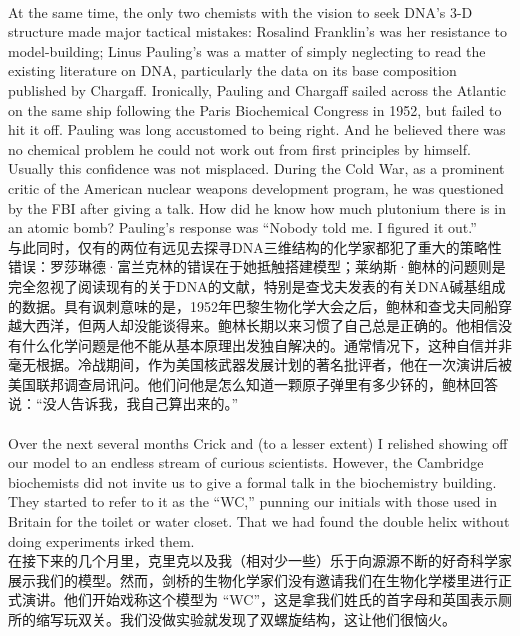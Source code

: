 \documentclass{article}
\begin{document}
\\
At the same time, the only two chemists with the vision to seek DNA’s 3-D structure made major tactical mistakes: Rosalind Franklin’s was her resistance to model-building; Linus Pauling’s was a matter of simply neglecting to read the existing literature on DNA, particularly the data on its base composition published by Chargaff. Ironically, Pauling and Chargaff sailed across the Atlantic on the same ship following the Paris Biochemical Congress in 1952, but failed to hit it off. Pauling was long accustomed to being right. And he believed there was no chemical problem he could not work out from first principles by himself. Usually this confidence was not misplaced. During the Cold War, as a prominent critic of the American nuclear weapons development program, he was questioned by the FBI after giving a talk. How did he know how much plutonium there is in an atomic bomb? Pauling’s response was “Nobody told me. I figured it out.”\\
与此同时，仅有的两位有远见去探寻DNA三维结构的化学家都犯了重大的策略性错误：罗莎琳德·富兰克林的错误在于她抵触搭建模型；莱纳斯·鲍林的问题则是完全忽视了阅读现有的关于DNA的文献，特别是查戈夫发表的有关DNA碱基组成的数据。具有讽刺意味的是，1952年巴黎生物化学大会之后，鲍林和查戈夫同船穿越大西洋，但两人却没能谈得来。鲍林长期以来习惯了自己总是正确的。他相信没有什么化学问题是他不能从基本原理出发独自解决的。通常情况下，这种自信并非毫无根据。冷战期间，作为美国核武器发展计划的著名批评者，他在一次演讲后被美国联邦调查局讯问。他们问他是怎么知道一颗原子弹里有多少钚的，鲍林回答说：“没人告诉我，我自己算出来的。” \\

\\
Over the next several months Crick and (to a lesser extent) I relished showing off our model to an endless stream of curious scientists. However, the Cambridge biochemists did not invite us to give a formal talk in the biochemistry building. They started to refer to it as the “WC,” punning our initials with those used in Britain for the toilet or water closet. That we had found the double helix without doing experiments irked them.\\
在接下来的几个月里，克里克以及我（相对少一些）乐于向源源不断的好奇科学家展示我们的模型。然而，剑桥的生物化学家们没有邀请我们在生物化学楼里进行正式演讲。他们开始戏称这个模型为 “WC”，这是拿我们姓氏的首字母和英国表示厕所的缩写玩双关。我们没做实验就发现了双螺旋结构，这让他们很恼火。\ 
\end{document}
